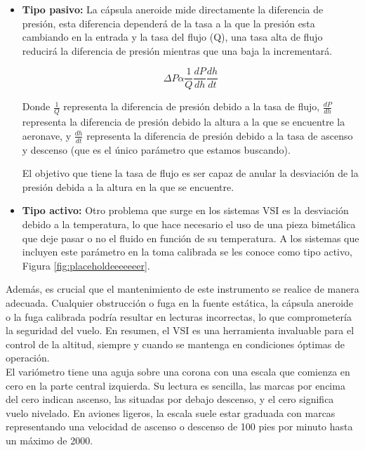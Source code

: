 \begin{itemize}
\item \textbf{Tipo pasivo:} La cápsula aneroide mide directamente la diferencia de presión, esta diferencia dependerá de la tasa a la que la presión esta cambiando en la entrada y la tasa del flujo (Q), una tasa alta de flujo reducirá la diferencia de presión mientras que una baja la incrementará.

\[ 
\Delta P \alpha \frac{1}{Q} \frac{dP}{dh} \frac{dh}{dt}
\]

Donde \(\frac{1}{Q}\) representa la diferencia de presión debido a la tasa de flujo, \(\frac{dP}{dh}\) representa la diferencia de presión debido la altura a la que se encuentre la aeronave, y \(\frac{dh}{dt}\) representa la diferencia de presión debido a la tasa de ascenso y descenso (que es el único parámetro que estamos buscando).

El objetivo que tiene la tasa de flujo es ser capaz de anular la desviación de la presión debida a la altura en la que se encuentre.

\item \textbf{Tipo activo:} Otro problema que surge en los sistemas VSI es la desviación debido a la temperatura, lo que hace necesario el uso de una pieza bimetálica que deje pasar o no el fluido en función de su temperatura. A los sistemas que incluyen este parámetro en la toma calibrada se les conoce como tipo activo, Figura \ref{fig:placeholdeeeeeeer}.\\
\end{itemize}

Además, es crucial que el mantenimiento de este instrumento se realice de manera adecuada. Cualquier obstrucción o fuga en la fuente estática, la cápsula aneroide o la fuga calibrada podría resultar en lecturas incorrectas, lo que comprometería la seguridad del vuelo. En resumen, el VSI es una herramienta invaluable para el control de la altitud, siempre y cuando se mantenga en condiciones óptimas de operación.\\

El variómetro tiene una aguja sobre una corona con una escala que comienza en cero en la parte central izquierda. Su lectura es sencilla, las marcas por encima del cero indican ascenso, las situadas por debajo descenso, y el cero significa vuelo nivelado. En aviones ligeros, la escala suele estar graduada con marcas representando una velocidad de ascenso o descenso de 100 pies por minuto hasta un máximo de 2000.\\

